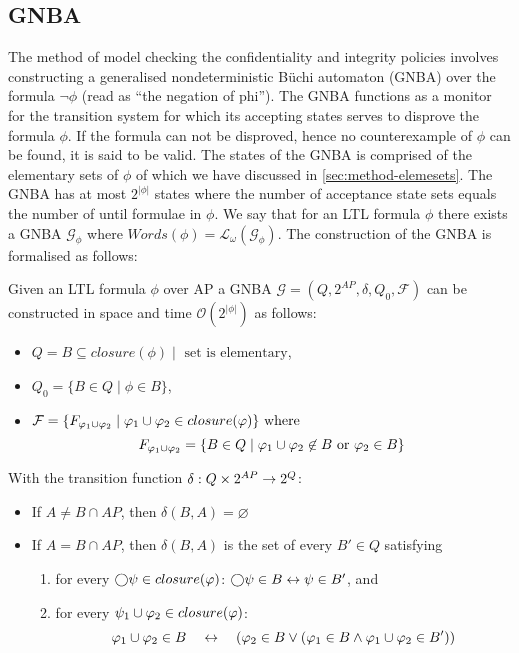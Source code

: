 \subsection{GNBA}
The method of model checking the confidentiality and integrity policies involves constructing a generalised nondeterministic Büchi automaton (GNBA) over the formula $\lnot\phi$ (read as ``the negation of phi''). The GNBA functions as a monitor for the transition system for which its accepting states serves to disprove the formula $\phi$. If the formula can not be disproved, hence no counterexample of $\phi$ can be found, it is said to be valid. The states of the GNBA is comprised of the elementary sets of $\phi$ of which we have discussed in \autoref{sec:method-elemesets}. The GNBA has at most $2^{|\phi|}$ states where the number of acceptance state sets equals the number of until formulae in $\phi$. We say that for an LTL formula $\phi$ there exists a GNBA $\mathcal{G_\phi}$ where $Words(\phi)=\mathcal{L}_\omega(\mathcal{G_\phi})$. The construction of the GNBA is formalised as follows:
\begin{definition}
\label{def:ltl-to-gnba}
Given an LTL formula $\phi$ over AP a GNBA $\mathcal{G}=(Q,2^{AP},\delta,Q_0,\mathcal{F})$ can be constructed in space and time $\mathcal{O}(2^{|\phi|})$ as follows:
\begin{itemize}
    \item $Q = B \subseteq closure(\phi) \mid \text{ set is elementary}$,
    \item $Q_0 = \{ B \in Q \mid \phi \in B \}$,
    \item $\mathcal{F} = \{F_{\varphi_1 \cup \varphi_2} \mid \varphi_1 \cup \varphi_2 \in closure(\varphi)\} \text{ where }$
    \begin{equation*}
        F_{\varphi_1 \cup \varphi_2} = \{B \in Q \mid \varphi_1 \cup \varphi_2 \not\in B \text{ or } \varphi_2 \in B\}
    \end{equation*}
\end{itemize}
With the transition function $\delta : Q \times 2^{AP} \rightarrow 2^Q$:
\begin{itemize}
    \item If $A \neq B \cap AP$, then $\delta(B,A)=\varnothing$
    \item If $A = B \cap AP$, then $\delta(B,A)$ is the set of every $B'\in Q$ satisfying
    \begin{enumerate}
        \item for every $\bigcirc\psi \in closure(\varphi)$: $\bigcirc\psi \in B \leftrightarrow \psi \in B'$, and
        \item for every $\psi_1 \cup \varphi_2 \in closure(\varphi)$:
        \begin{equation*}
            \varphi_1 \cup \varphi_2 \in B \quad\leftrightarrow\quad (\varphi_2 \in B \lor (\varphi_1 \in B \land \varphi_1 \cup \varphi_2 \in B'))
        \end{equation*}
    \end{enumerate}
\end{itemize}
\end{definition}

